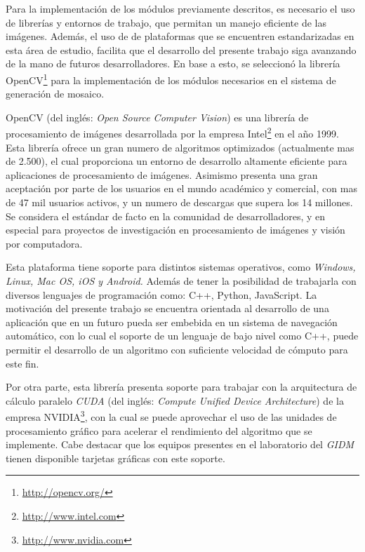 Para la implementación de los módulos previamente descritos, es necesario el uso de librerías y entornos de trabajo, que permitan un manejo eficiente de las imágenes. Además, el uso de de plataformas que se encuentren estandarizadas en esta área de estudio, facilita que el desarrollo del presente trabajo siga avanzando de la mano de futuros desarrolladores. En base a esto, se seleccionó la librería OpenCV\footnote{\url{http://opencv.org/}} para la implementación de los módulos necesarios en el sistema de generación de mosaico.

OpenCV (del inglés: \textit{Open Source Computer Vision}) es una librería de procesamiento de imágenes desarrollada por la empresa Intel\footnote{\url{http://www.intel.com}} en el año 1999. Esta librería ofrece un gran numero de algoritmos optimizados (actualmente mas de 2.500), el cual proporciona un entorno de desarrollo altamente eficiente para aplicaciones de procesamiento de imágenes. Asimismo presenta una gran aceptación por parte de los usuarios en el mundo académico y comercial, con mas de 47 mil usuarios activos, y un numero de descargas que supera los 14 millones. Se considera el estándar de facto en la comunidad de desarrolladores, y en especial para proyectos de investigación en procesamiento de imágenes y visión por computadora. 

Esta plataforma tiene soporte para distintos sistemas operativos, como \textit{Windows, Linux, Mac OS, iOS y Android.} Además de tener la posibilidad de trabajarla con diversos lenguajes de programación como: C++, Python, JavaScript. La motivación del presente trabajo se encuentra orientada al desarrollo de una aplicación que en un futuro pueda ser embebida en un sistema de navegación automático, con lo cual el soporte de un lenguaje de bajo nivel como C++, puede permitir el desarrollo de un algoritmo con suficiente velocidad de cómputo para este fin.

Por otra parte, esta librería presenta soporte para trabajar con la arquitectura de cálculo paralelo \textit{CUDA} (del inglés: \textit{Compute Unified Device Architecture}) de la empresa NVIDIA\footnote{\url{http://www.nvidia.com}}, con la cual se puede aprovechar el uso de las unidades de procesamiento gráfico para acelerar el rendimiento del algoritmo que se implemente. Cabe destacar que los equipos presentes en el laboratorio del \textit{GIDM} tienen disponible tarjetas gráficas con este soporte.

